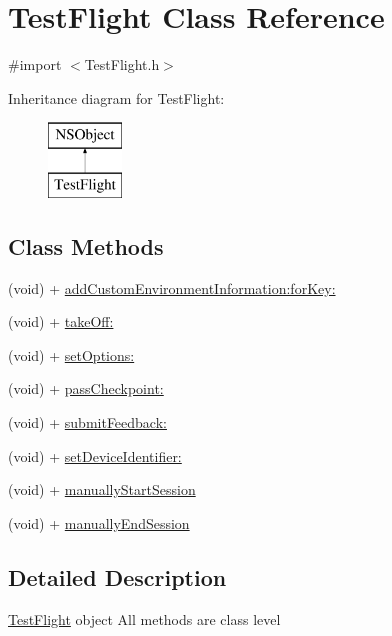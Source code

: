\hypertarget{interface_test_flight}{\section{Test\-Flight Class Reference}
\label{interface_test_flight}
}


{\ttfamily \#import $<$Test\-Flight.\-h$>$}

Inheritance diagram for Test\-Flight\-:\begin{figure}[H]
\begin{center}
\leavevmode
\includegraphics[height=2.000000cm]{interface_test_flight}
\end{center}
\end{figure}
\subsection*{Class Methods}
\begin{DoxyCompactItemize}
\item 
(void) + \hyperlink{interface_test_flight_a03922e1d4f8860fea67219f23397d9e2}{add\-Custom\-Environment\-Information\-:for\-Key\-:}
\item 
(void) + \hyperlink{interface_test_flight_a930ef9e34d78a38e623d717cdc8c5a3b}{take\-Off\-:}
\item 
(void) + \hyperlink{interface_test_flight_aeab53bbf35f81495258709461070db7a}{set\-Options\-:}
\item 
(void) + \hyperlink{interface_test_flight_aa28c2468cdd8d8ba3a1f363f98bd292f}{pass\-Checkpoint\-:}
\item 
(void) + \hyperlink{interface_test_flight_a672f3f6f97f61fce42980f75f8a955c9}{submit\-Feedback\-:}
\item 
(void) + \hyperlink{interface_test_flight_acc85f4afac29e1f5087eb9606f011411}{set\-Device\-Identifier\-:}
\item 
(void) + \hyperlink{interface_test_flight_a2ec362e403cf3b736409f70a0cb647aa}{manually\-Start\-Session}
\item 
(void) + \hyperlink{interface_test_flight_ad48e2271dccf881e558fdaa02bd0e654}{manually\-End\-Session}
\end{DoxyCompactItemize}


\subsection{Detailed Description}
\hyperlink{interface_test_flight}{Test\-Flight} object All methods are class level 

